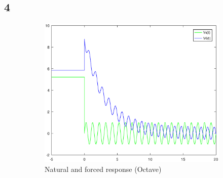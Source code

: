 
\subsection{4}	

\begin{figure}[h] \centering

\begin{subfigure}{0.4\textwidth}
\includegraphics[width=\textwidth]{Solution.eps}
\caption{Natural and forced response (Octave)}
\label{fig:first}
\end{subfigure}
\begin{subfigure}{0.4\textwidth}

\end{subfigure}
\end{figure}
